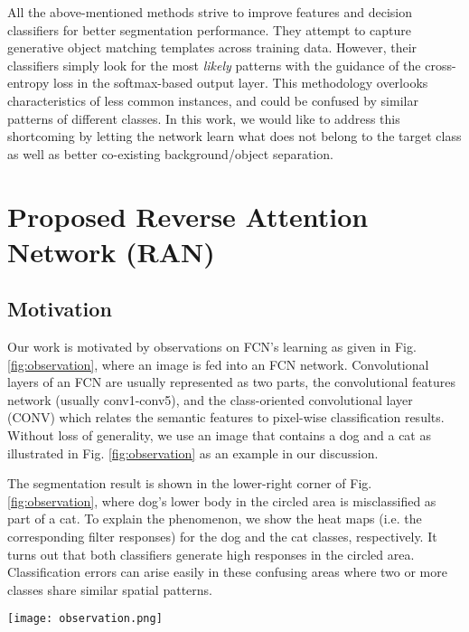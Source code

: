 \documentclass[runningheads]{llncs}
\begin{document}
All the above-mentioned methods strive to improve features and decision
classifiers for better segmentation performance. They
attempt to capture generative object matching templates across training
data. However, their classifiers simply look for the most
{\em likely} patterns with the guidance of the cross-entropy loss in the
softmax-based output layer. This methodology overlooks characteristics
of less common instances, and could be confused by similar patterns of
different classes. In this work, we would like to address this
shortcoming by letting the network learn what does not belong to the
target class as well as better co-existing background/object separation. 

\section{Proposed Reverse Attention Network (RAN)}

\subsection{Motivation}

Our work is motivated by observations on FCN's learning as given in Fig.
\ref{fig:observation}, where an image is fed into an FCN network. Convolutional
layers of an FCN are usually represented as two parts, the convolutional features network (usually conv1-conv5),
and the class-oriented convolutional layer (CONV) which relates the semantic features to pixel-wise classification results.
Without loss of generality, we use an image that contains a dog and a
cat as illustrated in Fig.  \ref{fig:observation} as an example in our
discussion. 

The segmentation result is shown in the lower-right corner of Fig.
\ref{fig:observation}, where dog's lower body in the circled area is
misclassified as part of a cat.  To explain the phenomenon, we show the
heat maps (i.e. the corresponding filter responses) for the dog and the
cat classes, respectively. It turns out that both classifiers generate
high responses in the circled area.  Classification errors can arise
easily in these confusing areas where two or more classes share similar
spatial patterns. 

\begin{figure*}
\begin{center}
\texttt{[image: observation.png]}
\end{center}
\caption{Observations on FCN's direct learning. The normalized feature response of the last conv5 layer is presented along with
the class-wise probability map for 'dog' and 'cat'.} \label{fig:observation}
\end{figure*}
\end{document}

